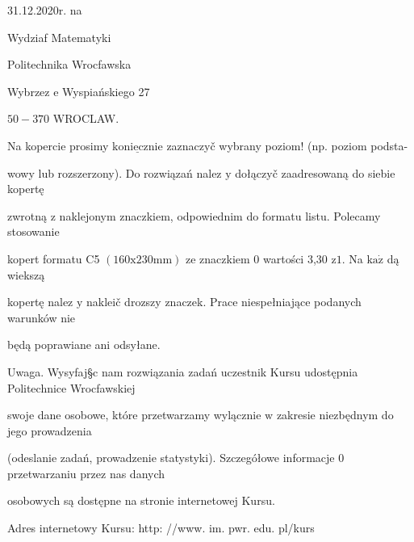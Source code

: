 \documentclass[a4paper,12pt]{article}
\begin{document}
31.12.2020r. na

Wydziaf Matematyki

Politechnika Wrocfawska

Wybrzez $\mathrm{e}$ Wyspiańskiego 27

$50-370$ WROCLAW.

Na kopercie prosimy $\underline{\mathrm{k}\mathrm{o}\mathrm{n}\mathrm{i}\mathrm{e}\mathrm{c}\mathrm{z}\mathrm{n}\mathrm{i}\mathrm{e}}$ zaznaczyč wybrany poziom! (np. poziom podsta-

wowy lub rozszerzony). Do rozwiązań nalez $\mathrm{y}$ dołączyč zaadresowaną do siebie kopertę

zwrotną $\mathrm{z}$ naklejonym znaczkiem, odpowiednim do formatu listu. Polecamy stosowanie

kopert formatu C5 $(160\mathrm{x}230\mathrm{m}\mathrm{m})$ ze znaczkiem $0$ wartości 3,30 $\mathrm{z}1$. Na $\mathrm{k}\mathrm{a}\dot{\mathrm{z}}$ dą wiekszą

kopertę nalez $\mathrm{y}$ nakleič drozszy znaczek. Prace niespełniające podanych warunków nie

będą poprawiane ani odsyłane.

Uwaga. Wysyfaj\S c nam rozwiązania zadań uczestnik Kursu udostępnia Politechnice Wrocfawskiej

swoje dane osobowe, które przetwarzamy wylącznie $\mathrm{w}$ zakresie niezbędnym do jego prowadzenia

(odeslanie zadań, prowadzenie statystyki). Szczegółowe informacje $0$ przetwarzaniu przez nas danych

osobowych są dostępne na stronie internetowej Kursu.

Adres internetowy Kursu: http: //www. im. pwr. edu. pl/kurs
\end{document}
